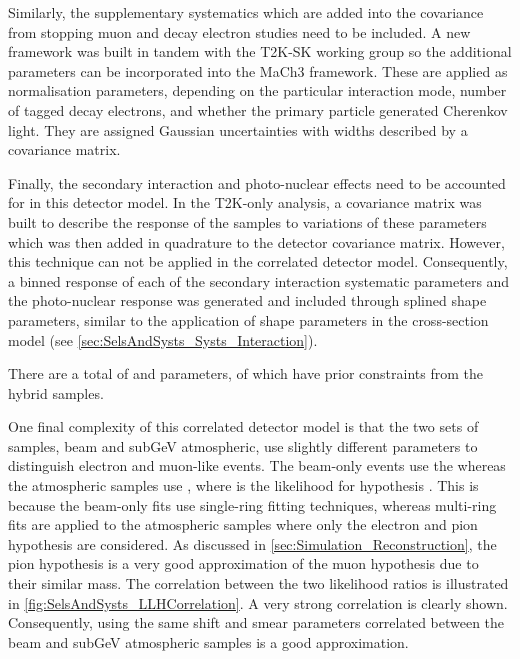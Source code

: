 Similarly, the supplementary systematics which are added into the covariance from stopping muon and decay electron studies need to be included. A new framework \cite{t2ksk-common} was built in tandem with the T2K-SK working group \cite{t2k_tn_326} so the additional parameters can be incorporated into the MaCh3 framework. These are applied as normalisation parameters, depending on the particular interaction mode, number of tagged decay electrons, and whether the primary particle generated Cherenkov light. They are assigned Gaussian uncertainties with widths described by a covariance matrix.

Finally, the secondary interaction and photo-nuclear effects need to be accounted for in this detector model. In the T2K-only analysis, a covariance matrix was built to describe the response of the samples to variations of these parameters which was then added in quadrature to the detector covariance matrix. However, this technique can not be applied in the correlated detector model. Consequently, a binned response of each of the secondary interaction systematic parameters and the photo-nuclear response was generated and included through splined shape parameters, similar to the application of shape parameters in the cross-section model (see \autoref{sec:SelsAndSysts_Systs_Interaction}).

There are a total of   and  parameters, of which  have prior constraints from the hybrid  samples.

One final complexity of this correlated detector model is that the two sets of samples, beam and subGeV atmospheric, use slightly different parameters to distinguish electron and muon-like events. The beam-only events use the  whereas the atmospheric samples use , where  is the likelihood for hypothesis . This is because the beam-only fits use single-ring \fq fitting techniques, whereas multi-ring fits are applied to the atmospheric samples where only the electron and pion hypothesis are considered. As discussed in \autoref{sec:Simulation_Reconstruction}, the pion hypothesis is a very good approximation of the muon hypothesis due to their similar mass. The correlation between the two likelihood ratios is illustrated in \autoref{fig:SelsAndSysts_LLHCorrelation}. A very strong correlation is clearly shown. Consequently, using the same shift and smear parameters correlated between the beam and subGeV atmospheric samples is a good approximation.

